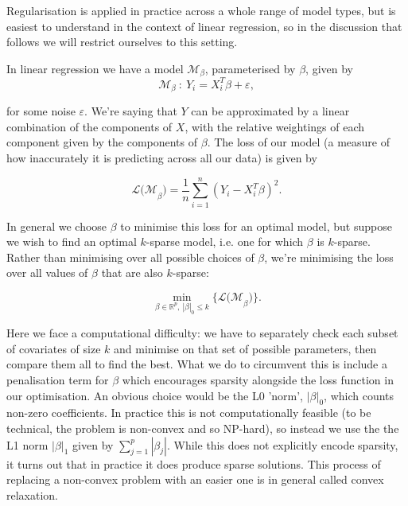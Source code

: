 \documentclass[thesis.tex]{subfiles}
\begin{document}
Regularisation is applied in practice across a whole range of model types, but is easiest to understand in the context of linear regression, so in the discussion that follows we will restrict ourselves to this setting. 

In linear regression we have a model $\mathcal{M}_\beta$, parameterised by $\beta$, given by 
\begin{equation}
\mathcal{M}_\beta \ : \ Y_i = X_i^T\beta + \varepsilon ,
\end{equation}

for some noise $\varepsilon$. We're saying that $Y$ can be approximated by a linear combination of the components of $X$, with the relative weightings of each component given by the components of $\beta$. The loss of our model (a measure of how inaccurately it is predicting across all our data) is given by 

\begin{equation}
\mathcal{L(M}_\beta) = \frac{1}{n}\sum\limits_{i=1}^{n} (Y_i - X_i^T\beta)^2. 
\end{equation}

In general we choose $\beta$ to minimise this loss for an optimal model, but suppose we wish to find an optimal $k$-sparse model, i.e. one for which $\beta$ is $k$-sparse. Rather than minimising over all possible choices of $\beta$, we're minimising the loss over all values of $\beta$ that are also $k$-sparse:

\begin{equation}
\min_{\beta \in \mathbb{R}^p, \ |\beta|_0 \leq k} \{ \mathcal{L(M}_\beta) \}.
\end{equation}

Here we face a computational difficulty: we have to separately check each subset of covariates of size $k$ and minimise on that set of possible parameters, then compare them all to find the best. What we do to circumvent this is include a penalisation term for $\beta$ which encourages sparsity alongside the loss function in our optimisation. An obvious choice would be the L0 'norm', $|\beta|_0$, which counts non-zero coefficients. In practice this is not computationally feasible (to be technical, the problem is non-convex and so NP-hard), so instead we use the the L1 norm $|\beta|_1$  given by $\sum_{j = 1}^{p} |\beta_j|$. While this does not explicitly encode sparsity, it turns out that in practice it does produce sparse solutions. This process of replacing a non-convex problem with an easier one is in general called convex relaxation. \\ ~ \\
\end{document}

